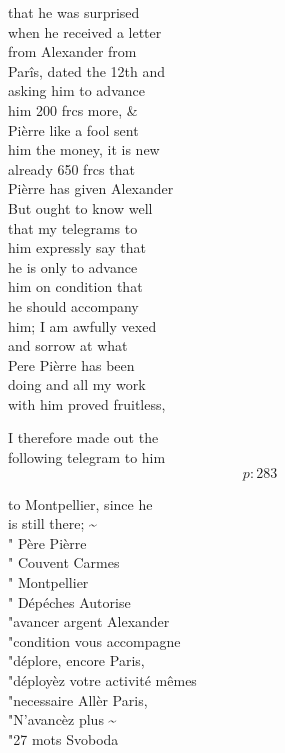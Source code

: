 \documentclass{report}
\begin{document}

	\par{
 	that he was surprised\ \\when he received a letter\ \\from Alexander from\ \\Parîs, dated the 12th and\ \\asking him to advance\ \\him 200 frcs more, \&\ \\Pièrre like a fool sent\ \\him the money, it is new\ \\already 650 frcs that\ \\Pièrre has given Alexander\ \\But ought to know well\ \\that my telegrams to\ \\him expressly say that\ \\he is only to advance\ \\him on condition that\ \\he should accompany\ \\him; I am awfully vexed\ \\and sorrow at what\ \\Pere Pièrre has been\ \\doing and all my work\ \\with him proved fruitless,\ \\
	}

	\par{
 	I therefore made out the\ \\following telegram to him\ \\
  \[p: 283 \]

	}


	\par{
 	to Montpellier, since he\ \\is still there; \~{}\ \\" Père Pièrre\ \\" Couvent Carmes\ \\" Montpellier\ \\" Dépéches Autorise\ \\"avancer argent Alexander\ \\"condition vous accompagne\ \\"déplore, encore Paris,\ \\"déployèz votre activité mêmes\ \\"necessaire Allèr Paris,\ \\"N'avancèz plus \~{}\ \\"27 mots Svoboda\ \\
	}
\end{document}
